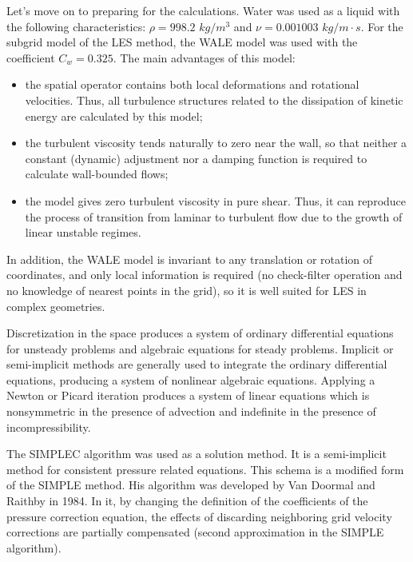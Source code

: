 	Let's move on to preparing for the calculations. Water was used as a liquid with the following characteristics: $\rho = 998.2$ $kg/m^3$ and $\nu = 0.001003$ $kg/m\cdot s$. For the subgrid model of the LES method, the WALE model was used with the coefficient $C_w = 0.325$. The main advantages of this model:
	\begin{itemize}
		\item the spatial operator contains both local deformations and rotational velocities. Thus, all turbulence structures related to the dissipation of kinetic energy are calculated by this model;
		\item the turbulent viscosity tends naturally to zero near the wall, so that neither a constant (dynamic) adjustment nor a damping function is required to calculate wall-bounded flows;
		\item the model gives zero turbulent viscosity in pure shear. Thus, it can reproduce the process of transition from laminar to turbulent flow due to the growth of linear unstable regimes.
	\end{itemize}
	In addition, the WALE model is invariant to any translation or rotation of coordinates, and only local information is required (no check-filter operation and no knowledge of nearest points in the grid), so it is well suited for LES in complex geometries\cite{Nicoud1999}.
	
	Discretization in the space produces a system of ordinary differential equations for unsteady problems and algebraic equations for steady problems. Implicit or semi-implicit methods are generally used to integrate the ordinary differential equations, producing a system of nonlinear algebraic equations. Applying a Newton or Picard iteration produces a system of linear equations which is nonsymmetric in the presence of advection and indefinite in the presence of incompressibility.
	
	The SIMPLEC algorithm was used as a solution method. It is a semi-implicit method for consistent pressure related equations. This schema is a modified form of the SIMPLE method. His algorithm was developed by Van Doormal and Raithby in 1984. In it, by changing the definition of the coefficients of the pressure correction equation, the effects of discarding neighboring grid velocity corrections are partially compensated (second approximation in the SIMPLE algorithm)\cite{Sun2008}.
	
